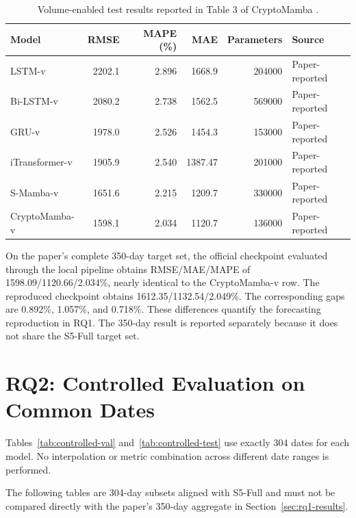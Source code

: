 \documentclass[13pt,a4paper,oneside]{report}
\begin{document}
\begin{table}[htbp]
\centering
\caption{Volume-enabled test results reported in Table 3 of CryptoMamba
\cite{cryptomamba}.}
\label{tab:paper-forecast}
{\small
\begin{tabularx}{\linewidth}{@{}Xrrrrl@{}}
\toprule
\textbf{Model} & \textbf{RMSE} & \textbf{MAPE (\%)} & \textbf{MAE} & \textbf{Parameters} & \textbf{Source} \\
\midrule
LSTM-v & \num{2202.1} & \num{2.896} & \num{1668.9} & \num{204000} & Paper-reported \\
Bi-LSTM-v & \num{2080.2} & \num{2.738} & \num{1562.5} & \num{569000} & Paper-reported \\
GRU-v & \num{1978.0} & \num{2.526} & \num{1454.3} & \num{153000} & Paper-reported \\
iTransformer-v & \num{1905.9} & \num{2.540} & \num{1387.47} & \num{201000} & Paper-reported \\
S-Mamba-v & \num{1651.6} & \num{2.215} & \num{1209.7} & \num{330000} & Paper-reported \\
CryptoMamba-v & \num{1598.1} & \num{2.034} & \num{1120.7} & \num{136000} & Paper-reported \\
\bottomrule
\end{tabularx}}
\end{table}

On the paper's complete 350-day target set, the official checkpoint evaluated through the local
pipeline obtains RMSE/MAE/MAPE of
\num{1598.09}/\num{1120.66}/\num{2.034}\%, nearly identical to the CryptoMamba-v row. The
reproduced checkpoint obtains \num{1612.35}/\num{1132.54}/\num{2.049}\%. The corresponding gaps
are \num{0.892}\%, \num{1.057}\%, and \num{0.718}\%. These differences quantify the forecasting
reproduction in RQ1. The 350-day result is reported separately because it does not share the
S5-Full target set.

\section{RQ2: Controlled Evaluation on Common Dates}\label{sec:rq2-results}
Tables~\ref{tab:controlled-val} and~\ref{tab:controlled-test} use exactly 304 dates for each model.
No interpolation or metric combination across different date ranges is performed.

The following tables are 304-day subsets aligned with S5-Full and must not be compared directly
with the paper's 350-day aggregate in Section~\ref{sec:rq1-results}.
\end{document}

